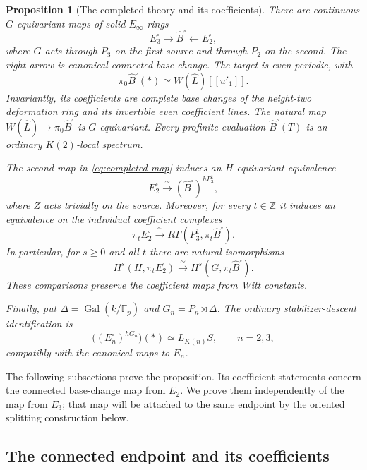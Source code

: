 \documentclass[11pt]{article}
\numberwithin{equation}{section}
\newtheorem{proposition}[theorem]{Proposition}
\theoremstyle{definition}
\theoremstyle{remark}
\begin{document}
\begin{proposition}[The completed theory and its coefficients]
\label{prop:completed-theory}
There are continuous $G$-equivariant maps of solid $E_\infty$-rings
\begin{equation}\label{eq:completed-map}
 E_3^{\square}\longrightarrow\widehat B^{\square}
       \longleftarrow E_2^{\square},
\end{equation}
where $G$ acts through $P_3$ on the first source and through $P_2$ on
the second. The right arrow is canonical connected base change.
The target is even periodic, with
\[
 \pi_0\widehat B^{\square}(*)\simeq W(\widehat L)[[u'_1]].
\]
Invariantly, its coefficients are complete base changes of the
height-two deformation ring and its invertible even coefficient lines.
The natural map $W(\widehat L)\to\pi_0\widehat B^{\square}$ is
$G$-equivariant.  Every profinite evaluation
$\widehat B^{\square}(T)$ is an ordinary $K(2)$-local spectrum.

The second map in \eqref{eq:completed-map} induces an $H$-equivariant
equivalence
\[
 E_2^{\square}\xrightarrow{\ \sim\ }
       (\widehat B^{\square})^{hP_3^1},
\]
where $\overline Z$ acts trivially on the source.  Moreover, for every
$t\in\mathbb Z$ it induces an equivalence on the individual coefficient
complexes
\[
 \pi_tE_2^{\square}\xrightarrow{\ \sim\ }
       R\Gamma(P_3^1,\pi_t\widehat B^{\square}).
\]
In particular, for $s\ge0$ and all $t$ there are natural isomorphisms
\begin{equation}\label{eq:coefficient-descent}
 H^s(H,\pi_tE_2^{\square})
       \xrightarrow{\ \sim\ }
 H^s(G,\pi_t\widehat B^{\square}).
\end{equation}
These comparisons preserve the coefficient maps from Witt constants.

Finally, put $\Delta=\operatorname{Gal}(k/\mathbb F_p)$ and
$G_n=P_n\rtimes\Delta$.  The ordinary stabilizer-descent identification
is
\[
 \bigl((E_n^{\square})^{hG_n}\bigr)(*)\simeq L_{K(n)}S,
 \qquad n=2,3,
\]
compatibly with the canonical maps to $E_n$.
\end{proposition}

The following subsections prove the proposition. Its coefficient
statements concern the connected
base-change map from \(E_2\). We prove them independently of the map
from \(E_3\); that map will be attached to the same endpoint by the
oriented splitting construction below.

\subsection{The connected endpoint and its coefficients}
\end{document}
